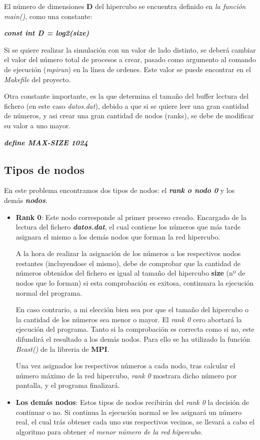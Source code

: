 \documentclass[11pt]{article}
\begin{document}
El número de dimensiones \textbf{D} del hipercubo se encuentra definido en \textit{la función main()}, como una constante:

\textit{\textbf{const int D = log2(size)}}

Si se quiere realizar la simulación con un valor de lado distinto, se deberá cambiar el valor del número total de procesos a crear, pasado como argumento al comando de ejecución (\textit{mpirun}) en la línea de ordenes. Este valor se puede encontrar en el \textit{Makefile} del proyecto.

Otra constante importante, es la que determina el tamaño del buffer lectura del fichero (en este caso \textit{datos.dat}), debido a que si se quiere leer una gran cantidad de números, y asi crear una gran cantidad de nodos (ranks), se debe de modificar su valor a uno mayor.

\textit{\textbf{define MAX-SIZE 1024}}

\subsection{Tipos de nodos}
En este problema encontramos dos tipos de nodos: el \textbf{\textit{rank o nodo 0}} y los demás \textbf{\textit{nodos}}.

\begin{itemize}
	\item \textbf{Rank 0}: Este nodo corresponde al primer proceso creado. Encargado de la lectura del fichero \textit{\textbf{datos.dat}}, el cual contiene los números que más tarde asignara el mismo a los demás nodos que forman la red hipercubo.
	
	A la hora de realizar la asignación de los números a los respectivos nodos restantes (incluyendose el mismo), debe de comprobar que la cantidad de números obtenidos del fichero es igual al tamaño del hipercubo \textbf{size} (nº de nodos que lo forman) si esta comprobación es exitosa, continuara la ejecución normal del programa.
	
	En caso contrario, a mi elección bien sea por que el tamaño del hipercubo o la cantidad de los números sea menor o mayor. El \textit{rank 0} cero abortará la ejecución del programa. 
	Tanto si la comprobación es correcta como si no, este difundirá el resultado a los demás nodos. Para ello se ha utilizado la función \textit{Bcast()} de la libreria de \textbf{MPI}.
	
	Una vez asignados los respectivos números a cada nodo, tras calcular el número máximo de la red hipercubo, \textit{rank 0} mostrara dicho número por pantalla, y el programa finalizará.
	
	\item \textbf{Los demás nodos}: Estos tipos de nodos recibirán del \textit{rank 0} la decisión de continuar o no. Si continua la ejecución normal se les asignará un número real, el cual trás obtener cada uno sus respectivos vecinos, se  llevará a cabo el algoritmo para obtener \textit{el menor número de la red hipercubo}.
\end{itemize}
\end{document}
